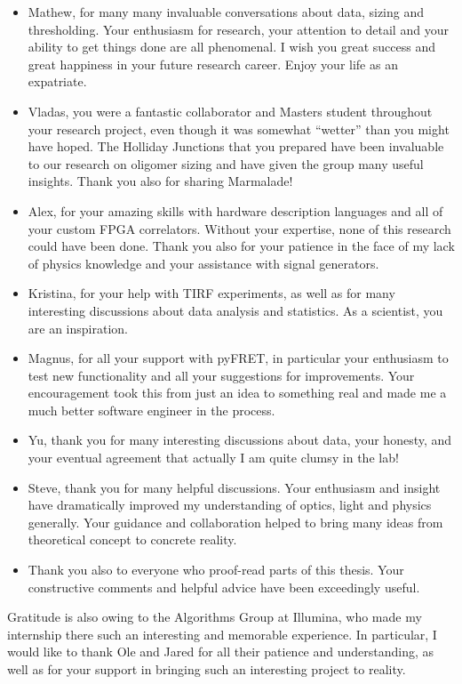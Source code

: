 \begin{itemize}
\item[] Mathew, for many many invaluable conversations about data, sizing and thresholding. Your enthusiasm for research, your attention to detail and your ability to get things done are all phenomenal. I wish you great success and great happiness in your future research career. Enjoy your life as an expatriate.
\item[] Vladas, you were a fantastic collaborator and Masters student throughout your research project, even though it was somewhat ``wetter'' than you might have hoped. The Holliday Junctions that you prepared have been invaluable to our research on oligomer sizing and have given the group many useful insights. Thank you also for sharing Marmalade!
\item[] Alex, for your amazing skills with hardware description languages and all of your custom FPGA correlators. Without your expertise, none of this research could have been done. Thank you also for your patience in the face of my lack of physics knowledge and your assistance with signal generators.
\item[] Kristina, for your help with TIRF experiments, as well as for many interesting discussions about data analysis and statistics. As a scientist, you are an inspiration.
\item[] Magnus, for all your support with pyFRET, in particular your enthusiasm to test new functionality and all your suggestions for improvements. Your encouragement took this from just an idea to something real and made me a much better software engineer in the process.
\item[] Yu, thank you for many interesting discussions about data, your honesty, and your eventual agreement that actually I am quite clumsy in the lab!
\item[] Steve, thank you for many helpful discussions. Your enthusiasm and insight have dramatically improved my understanding of optics, light and physics generally. Your guidance and collaboration helped to bring many ideas from theoretical concept to concrete reality.
\item[] Thank you also to everyone who proof-read parts of this thesis. Your constructive comments and helpful advice have been exceedingly useful.
\end{itemize}

Gratitude is also owing to the Algorithms Group at Illumina, who made my internship there such an interesting and memorable experience. In particular, I would like to thank Ole and Jared for all their patience and understanding, as well as for your support in bringing such an interesting project to reality.

